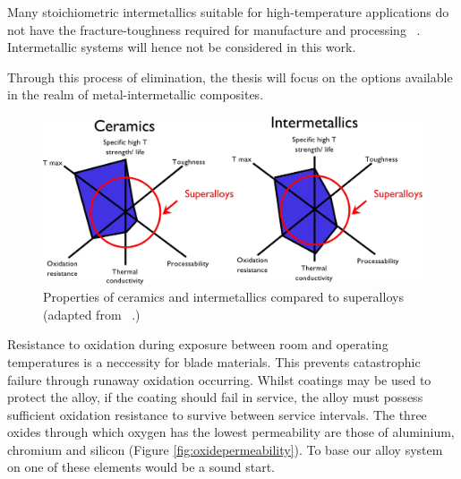 Many stoichiometric intermetallics suitable for high-temperature applications do not have the fracture-toughness required for manufacture and processing ~\cite{kumar91}.  Intermetallic systems will hence not be considered in this work. 

Through this process of elimination, the thesis will focus on the options available in the realm of metal-intermetallic composites.
%
\begin{figure}[H]
\begin{center}
\includegraphics[width=\textwidth]{CeramicsIntermetallics}
\caption{Properties of ceramics and intermetallics compared to superalloys (adapted from ~\cite{nathal92}.) }\label{fig:CeramicsIntermetallics}
\end{center}
\end{figure}
%

Resistance to oxidation during exposure between room and operating temperatures is a neccessity for blade materials.  This prevents catastrophic failure through runaway oxidation occurring.  Whilst coatings may be used to protect the alloy, if the coating should fail in service, the alloy must possess sufficient oxidation resistance to survive between service intervals.  The three oxides through which oxygen has the lowest permeability are those of aluminium, chromium and silicon (Figure \ref{fig:oxidepermeability}).  To base our alloy system on one of these elements would be a sound start.

